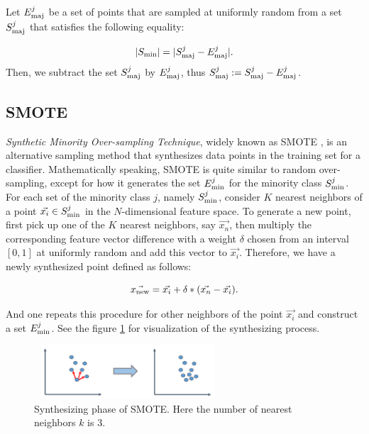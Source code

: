 Let $E_{\rm{maj}}^j$ be a set of points that are sampled at uniformly random from a set $S_{\rm{maj}}^{j}$ that satisfies the following equality:

	\begin{equation}
	|S_{\rm{min}}| = | S_{\rm{maj}}^j -  E_{\rm{maj}}^j |.
	\end{equation}
Then, we subtract the set $S_{\rm{maj}}^j$ by $E_{\rm{maj}}^j$, thus $S_{\rm{maj}}^j := S_{\rm{maj}}^j -  E_{\rm{maj}}^j$.
		
		\subsection{SMOTE}
		\textit{Synthetic Minority Over-sampling Technique}, widely known as SMOTE \cite{SMOTE}, is an alternative sampling method that synthesizes data points in the training set for a classifier. Mathematically speaking, SMOTE is quite similar to random over-sampling, except for how it generates the set $E_{\rm{min}}^j$ for the minority class $S_{\rm{min}}^j$. For each set of the minority class $j$, namely $S_{\rm{min}}^j$, consider $K$ nearest neighbors of a point $\vec{x_i} \in S_{\rm{min}}^j$ in the $N$-dimensional feature space. To generate a new point, first pick up one of the $K$ nearest neighbors, say $\vec{x_{n}}$, then multiply the corresponding feature vector difference with a weight  $\delta$  chosen from an interval $ [0,1]$ at uniformly random and add this vector to $\vec{x_i}$. Therefore, we have a newly synthesized point defined as follows:
		
		\begin{equation}
		\vec{x_{\rm{new}}} = \vec{x_{i}} + \delta*(\vec{x_{n}} - \vec{x_{i}}).
		\end{equation}

And one repeats this procedure for other neighbors of the point $\vec{x_i}$ and construct a set $E_{\rm{min}}^j$. See the figure \ref{smote} for visualization of the synthesizing process.	
		
		\begin{figure}[ht]
		\begin{center}
		\vspace{0.5cm}
		\includegraphics[clip,width=7cm,height = 2cm]{figs/SMOTE.png}
		\vspace{0.5cm}
		\caption{Synthesizing phase of SMOTE. Here the number of nearest neighbors $k$ is 3.}
		\label{smote}
		\end{center}
		\end{figure}
		

